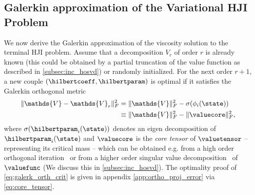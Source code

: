 \subsection{Galerkin approximation of the Variational HJI Problem}
\label{subsec:galerkin}
%
We now derive the Galerkin approximation of the viscosity solution to the terminal HJI problem. Assume that a decomposition $V_{r}$ of order $r$ is already known (this could be obtained by a partial truncation of the value function as described in \autoref{subsec:inc_hosvd}) or randomly initialized. For the next order $r+1$, a new couple $\left(\hilbertcoeff, \hilbertparam\right)$ is optimal if it satisfies the Galerkin orthogonal metric %
%
\begin{align}
	\| \mathds{V} - \mathds{V}_{r} \|_F^2 &= \|\mathds{V} \|_F^2 - \sigma(\phi_i(\state)) \nonumber \\
	&\equiv \|\mathds{V} \|_F^2 - \| \valuecore \|_F^2,
	\label{eq:galerk_orth_crit}
\end{align}
%
where $\sigma(\hilbertparam_i(\state))$ denotes an eigen decomposition of $\hilbertparam_i(\state)$ and $\valuecore$ is the \textit{core tensor} of $\valuetensor$ -- representing its critical mass -- which can be obtained e.g. from a high order orthogonal iteration~\cite{Kolda2009} or from a higher order singular value decomposition~\cite{DeLathauwer2000, VannieuwenhovenTruncate2012} of $\valuefunc$ (We discuss this in \autoref{subsec:inc_hosvd}). The optimality proof of \eqref{eq:galerk_orth_crit} is given in appendix \ref{app:ortho_proj_error} via \eqref{eq:core_tensor}. 	

